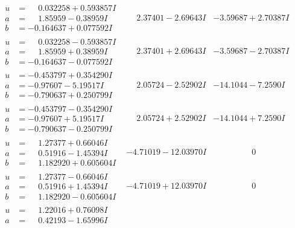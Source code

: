 \documentclass[1p]{elsarticle_modified}
\theoremstyle{definition}
\begin{document}
$$\begin{array}{c|c|c}
 \hline 
\begin{aligned}
u &= \phantom{-}0.032258 + 0.593857 I \\
a &= \phantom{-}1.85959 - 0.38959 I \\
b &= -0.164637 + 0.077592 I\end{aligned}
 & \phantom{-}2.37401 - 2.69643 I & -3.59687 + 2.70387 I \\ \hline\begin{aligned}
u &= \phantom{-}0.032258 - 0.593857 I \\
a &= \phantom{-}1.85959 + 0.38959 I \\
b &= -0.164637 - 0.077592 I\end{aligned}
 & \phantom{-}2.37401 + 2.69643 I & -3.59687 - 2.70387 I \\ \hline\begin{aligned}
u &= -0.453797 + 0.354290 I \\
a &= -0.97607 - 5.19517 I \\
b &= -0.790637 + 0.250799 I\end{aligned}
 & \phantom{-}2.05724 - 2.52902 I & -14.1044 - 7.2590 I \\ \hline\begin{aligned}
u &= -0.453797 - 0.354290 I \\
a &= -0.97607 + 5.19517 I \\
b &= -0.790637 - 0.250799 I\end{aligned}
 & \phantom{-}2.05724 + 2.52902 I & -14.1044 + 7.2590 I \\ \hline\begin{aligned}
u &= \phantom{-}1.27377 + 0.66046 I \\
a &= \phantom{-}0.51916 - 1.45394 I \\
b &= \phantom{-}1.182920 + 0.605604 I\end{aligned}
 & -4.71019 - 12.03970 I & \phantom{-0.000000 } 0 \\ \hline\begin{aligned}
u &= \phantom{-}1.27377 - 0.66046 I \\
a &= \phantom{-}0.51916 + 1.45394 I \\
b &= \phantom{-}1.182920 - 0.605604 I\end{aligned}
 & -4.71019 + 12.03970 I & \phantom{-0.000000 } 0 \\ \hline\begin{aligned}
u &= \phantom{-}1.22016 + 0.76098 I \\
a &= \phantom{-}0.42193 - 1.65996 I \\

\end{aligned}
\end{array}$$
\end{document}
